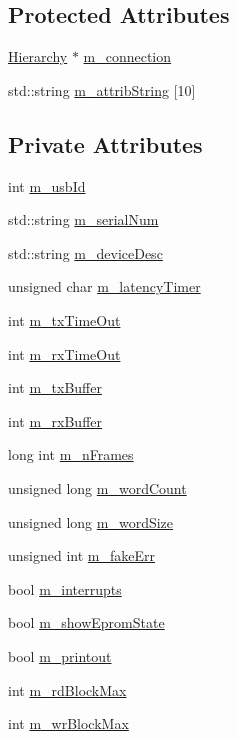 \subsection*{Protected Attributes}
\begin{DoxyCompactItemize}
\item 
\hyperlink{classHierarchy}{Hierarchy} $\ast$ \hyperlink{classElement_abe3de7a5dbbc9a6dd2d7e012e5fdb266}{m\_\-connection}
\item 
std::string \hyperlink{classAttrib_a3414521d7a82476e874b25a5407b5e63}{m\_\-attribString} \mbox{[}10\mbox{]}
\end{DoxyCompactItemize}
\subsection*{Private Attributes}
\begin{DoxyCompactItemize}
\item 
int \hyperlink{classUsbFTInterface_a91df5c0547e8be460bc087e27afe05aa}{m\_\-usbId}
\item 
std::string \hyperlink{classUsbFTInterface_a031610ca38939734ec7431d80f5f299f}{m\_\-serialNum}
\item 
std::string \hyperlink{classUsbFTInterface_a500067688c32cdb3719fecf128e88dca}{m\_\-deviceDesc}
\item 
unsigned char \hyperlink{classUsbFTInterface_a0eefe6f2cee132da70176562cd126718}{m\_\-latencyTimer}
\item 
int \hyperlink{classUsbFTInterface_af88e498a8ed759e35ae9e94f74ffcf56}{m\_\-txTimeOut}
\item 
int \hyperlink{classUsbFTInterface_a0153d99857eaa634e4b9fc1ec58caf52}{m\_\-rxTimeOut}
\item 
int \hyperlink{classUsbFTInterface_a10385649160531f6976d55176bee1f2d}{m\_\-txBuffer}
\item 
int \hyperlink{classUsbFTInterface_a7007c5112d381f5caefa133a42bd900d}{m\_\-rxBuffer}
\item 
long int \hyperlink{classUsbFTInterface_a40770504afc4173034c8a8d6c5f5962c}{m\_\-nFrames}
\item 
unsigned long \hyperlink{classUsbFTInterface_a91c81850db2579afa6a5296e0bf0dbef}{m\_\-wordCount}
\item 
unsigned long \hyperlink{classUsbFTInterface_a05ccc38a60c4b921b835238b604b38d8}{m\_\-wordSize}
\item 
unsigned int \hyperlink{classUsbFTInterface_ab3660cba031df164b2d2df6e4c40f291}{m\_\-fakeErr}
\item 
bool \hyperlink{classUsbFTInterface_a0a6e3a781ead9833a413e230c6f8d1f4}{m\_\-interrupts}
\item 
bool \hyperlink{classUsbFTInterface_aa5c215777af41de94a2b371c59c88c7c}{m\_\-showEpromState}
\item 
bool \hyperlink{classUsbFTInterface_aa4d5f5ffb4d3b26f1effdf84087aea91}{m\_\-printout}
\item 
int \hyperlink{classUsbFTInterface_a0f5050f1ed93392c8e5e4acaf7b75e1c}{m\_\-rdBlockMax}
\item 
int \hyperlink{classUsbFTInterface_ad0512841c67ea39da7701e990628059a}{m\_\-wrBlockMax}
\end{DoxyCompactItemize}


